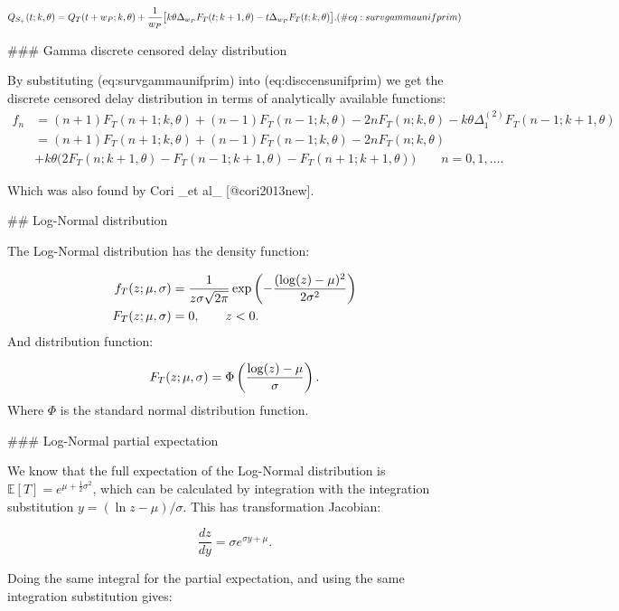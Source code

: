 \documentclass[10pt,letterpaper]{article}
\begin{document}
$$
Q_{S_+}(t; k, \theta) = Q_T(t + w_P; k, \theta) + { 1 \over w_P} \big[ k \theta \Delta_{w_P}F_T(t; k+1, \theta) - t \Delta_{w_P}F_T(t; k, \theta) \big].
(\#eq:survgammaunifprim)
$$

### Gamma discrete censored delay distribution

By substituting \@ref(eq:survgammaunifprim) into \@ref(eq:disccensunifprim) we get the discrete censored delay distribution in terms of analytically available functions:
$$
\begin{aligned}
f_n &= (n+1) F_T(n+1; k, \theta) + (n-1) F_T(n-1; k, \theta) - 2  n F_T(n; k, \theta) - k \theta \Delta_1^{(2)}F_T(n-1; k+1, \theta)\\
 &= (n+1) F_T(n+1; k, \theta) + (n-1) F_T(n-1; k, \theta) - 2  n F_T(n; k, \theta) \\
 &+ k \theta \Big( 2 F_T(n; k+1, \theta) - F_T(n-1; k+1, \theta) - F_T(n+1; k+1,\theta)  \Big) \qquad n = 0, 1, \dots.
\end{aligned}
$$

Which was also found by Cori _et al_ [@cori2013new].

## Log-Normal distribution

The Log-Normal distribution has the density function:

$$
\begin{aligned}
f_T(z;\mu, \sigma) &= {1 \over z \sigma \sqrt{2\pi}} \exp\left( - {(\log(z) - \mu)^2 \over 2 \sigma^2} \right)\\
F_T(z;\mu, \sigma) &= 0, \qquad z < 0.
\end{aligned}
$$
And distribution function:

$$
F_T(z;\mu, \sigma) = \Phi\left( {\log(z) - \mu \over \sigma} \right).
$$
Where $\Phi$ is the standard normal distribution function.

### Log-Normal partial expectation

We know that the full expectation of the Log-Normal distribution is $\mathbb{E}[T] = e^{\mu + \frac{1}{2} \sigma^2}$, which can be calculated by integration with the integration substitution $y = (\ln z - \mu) / \sigma$. This has transformation Jacobian:

$$
\frac{dz}{dy} = \sigma e^{\sigma y + \mu}.
$$

Doing the same integral for the partial expectation, and using the same integration substitution gives:
\end{document}
